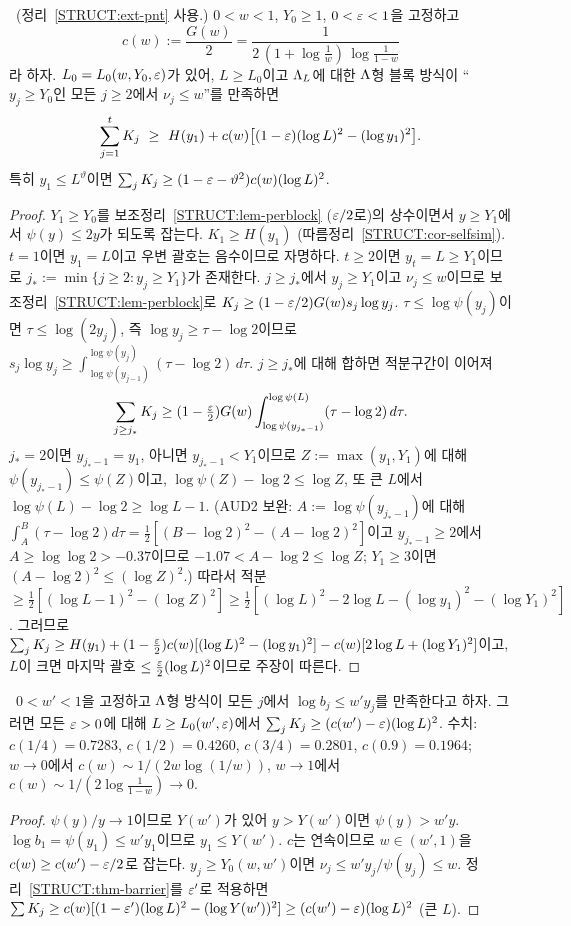 \begin{theorem}\label{STRUCT:thm-barrier}
\PROVED\ (정리~\ref{STRUCT:ext-pnt} 사용.) $0<w<1$, $Y_0\ge1$, $0<\varepsilon<1$을 고정하고
\[
c(w):=\frac{G(w)}2=\frac1{2\,(1+\log\frac1w)\,\log\frac1{1-w}}
\]
라 하자. $L_0=L_0(w,Y_0,\varepsilon)$가 있어, $L\ge L_0$이고 $\Lambda_L$에 대한 $\Lambda$형 블록 방식이 ``$y_j\ge Y_0$인 모든 $j\ge2$에서 $\nu_j\le w$''를 만족하면
\[
\sum_{j=1}^tK_j\ \ge\ H(y_1)+c(w)\bigl[(1-\eps)(\log L)^2-(\log y_1)^2\bigr].
\]
특히 $y_1\le L^{\vartheta}$이면 $\sum_jK_j\ge(1-\varepsilon-\vartheta^2)c(w)(\log L)^2$.
\end{theorem}
\begin{proof}
$Y_1\ge Y_0$를 보조정리~\ref{STRUCT:lem-perblock} ($\varepsilon/2$로)의 상수이면서 $y\ge Y_1$에서 $\psi(y)\le2y$가 되도록 잡는다. $K_1\ge H(y_1)$ (따름정리~\ref{STRUCT:cor-selfsim}). $t=1$이면 $y_1=L$이고 우변 괄호는 음수이므로 자명하다. $t\ge2$이면 $y_t=L\ge Y_1$이므로 $j_*:=\min\{j\ge2:y_j\ge Y_1\}$가 존재한다.
$j\ge j_*$에서 $y_j\ge Y_1$이고 $\nu_j\le w$이므로 보조정리~\ref{STRUCT:lem-perblock}로 $K_j\ge(1-\varepsilon/2)G(w)s_j\log y_j$. $\tau\le\log\psi(y_j)$이면 $\tau\le\log(2y_j)$, 즉 $\log y_j\ge \tau-\log2$이므로
$s_j\log y_j\ge\int_{\log\psi(y_{j-1})}^{\log\psi(y_j)}(\tau-\log2)\,d\tau$.
$j\ge j_*$에 대해 합하면 적분구간이 이어져
\[
\sum_{j\ge j_*}K_j\ge(1-\tfrac{\varepsilon}2)G(w)\int_{\log\psi(y_{j_*-1})}^{\log\psi(L)}(\tau-\log2)\,d\tau .
\]
$j_*=2$이면 $y_{j_*-1}=y_1$, 아니면 $y_{j_*-1}<Y_1$이므로 $Z:=\max(y_1,Y_1)$에 대해 $\psi(y_{j_*-1})\le\psi(Z)$이고, $\log\psi(Z)-\log2\le\log Z$, 또 큰 $L$에서 $\log\psi(L)-\log2\ge\log L-1$.
(AUD2 보완: $A:=\log\psi(y_{j_*-1})$에 대해 $\int_A^B(\tau-\log2)d\tau=\frac12[(B-\log2)^2-(A-\log2)^2]$이고 $y_{j_*-1}\ge2$에서 $A\ge\log\log2>-0.37$이므로 $-1.07<A-\log2\le\log Z$; $Y_1\ge3$이면 $(A-\log2)^2\le(\log Z)^2$.) 따라서 적분 $\ge\frac12[(\log L-1)^2-(\log Z)^2]\ge\frac12[(\log L)^2-2\log L-(\log y_1)^2-(\log Y_1)^2]$.
그러므로 $\sum_jK_j\ge H(y_1)+(1-\frac{\varepsilon}2)c(w)[(\log L)^2-(\log y_1)^2]-c(w)[2\log L+(\log Y_1)^2]$이고, $L$이 크면 마지막 괄호 $\le\frac{\varepsilon}2(\log L)^2$이므로 주장이 따른다.
\end{proof}

\begin{corollary}\label{STRUCT:cor-geometric}
\PROVED\ $0<w'<1$을 고정하고 $\Lambda$형 방식이 모든 $j$에서 $\log b_j\le w'y_j$를 만족한다고 하자. 그러면 모든 $\varepsilon>0$에 대해 $L\ge L_0(w',\varepsilon)$에서 $\sum_jK_j\ge(c(w')-\varepsilon)(\log L)^2$.
수치: $c(1/4)=0.7283$, $c(1/2)=0.4260$, $c(3/4)=0.2801$, $c(0.9)=0.1964$; $w\to0$에서 $c(w)\sim1/(2w\log(1/w))$, $w\to1$에서 $c(w)\sim1/(2\log\frac1{1-w})\to0$.
\end{corollary}
\begin{proof}
$\psi(y)/y\to1$이므로 $Y(w')$가 있어 $y>Y(w')$이면 $\psi(y)>w'y$. $\log b_1=\psi(y_1)\le w'y_1$이므로 $y_1\le Y(w')$. $c$는 연속이므로 $w\in(w',1)$을 $c(w)\ge c(w')-\varepsilon/2$로 잡는다. $y_j\ge Y_0(w,w')$이면 $\nu_j\le w'y_j/\psi(y_j)\le w$. 정리~\ref{STRUCT:thm-barrier}를 $\varepsilon'$로 적용하면 $\sum K_j\ge c(w)[(1-\varepsilon')(\log L)^2-(\log Y(w'))^2]\ge(c(w')-\varepsilon)(\log L)^2$ (큰 $L$).
\end{proof}

